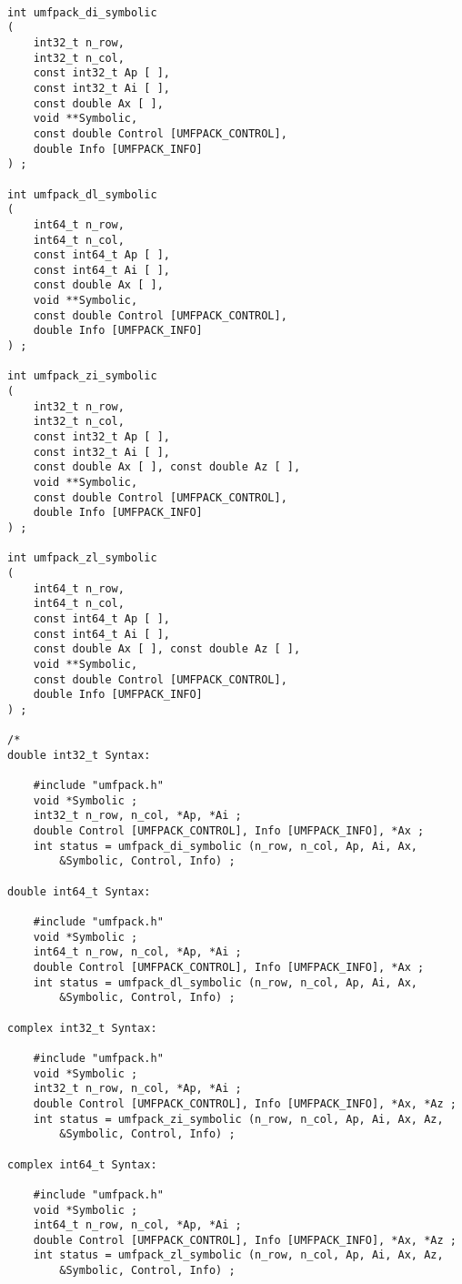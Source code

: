 \documentclass[11pt]{article}
\begin{document}
{\footnotesize
\begin{verbatim}

int umfpack_di_symbolic
(
    int32_t n_row,
    int32_t n_col,
    const int32_t Ap [ ],
    const int32_t Ai [ ],
    const double Ax [ ],
    void **Symbolic,
    const double Control [UMFPACK_CONTROL],
    double Info [UMFPACK_INFO]
) ;

int umfpack_dl_symbolic
(
    int64_t n_row,
    int64_t n_col,
    const int64_t Ap [ ],
    const int64_t Ai [ ],
    const double Ax [ ],
    void **Symbolic,
    const double Control [UMFPACK_CONTROL],
    double Info [UMFPACK_INFO]
) ;

int umfpack_zi_symbolic
(
    int32_t n_row,
    int32_t n_col,
    const int32_t Ap [ ],
    const int32_t Ai [ ],
    const double Ax [ ], const double Az [ ],
    void **Symbolic,
    const double Control [UMFPACK_CONTROL],
    double Info [UMFPACK_INFO]
) ;

int umfpack_zl_symbolic
(
    int64_t n_row,
    int64_t n_col,
    const int64_t Ap [ ],
    const int64_t Ai [ ],
    const double Ax [ ], const double Az [ ],
    void **Symbolic,
    const double Control [UMFPACK_CONTROL],
    double Info [UMFPACK_INFO]
) ;

/*
double int32_t Syntax:

    #include "umfpack.h"
    void *Symbolic ;
    int32_t n_row, n_col, *Ap, *Ai ;
    double Control [UMFPACK_CONTROL], Info [UMFPACK_INFO], *Ax ;
    int status = umfpack_di_symbolic (n_row, n_col, Ap, Ai, Ax,
        &Symbolic, Control, Info) ;

double int64_t Syntax:

    #include "umfpack.h"
    void *Symbolic ;
    int64_t n_row, n_col, *Ap, *Ai ;
    double Control [UMFPACK_CONTROL], Info [UMFPACK_INFO], *Ax ;
    int status = umfpack_dl_symbolic (n_row, n_col, Ap, Ai, Ax,
        &Symbolic, Control, Info) ;

complex int32_t Syntax:

    #include "umfpack.h"
    void *Symbolic ;
    int32_t n_row, n_col, *Ap, *Ai ;
    double Control [UMFPACK_CONTROL], Info [UMFPACK_INFO], *Ax, *Az ;
    int status = umfpack_zi_symbolic (n_row, n_col, Ap, Ai, Ax, Az,
        &Symbolic, Control, Info) ;

complex int64_t Syntax:

    #include "umfpack.h"
    void *Symbolic ;
    int64_t n_row, n_col, *Ap, *Ai ;
    double Control [UMFPACK_CONTROL], Info [UMFPACK_INFO], *Ax, *Az ;
    int status = umfpack_zl_symbolic (n_row, n_col, Ap, Ai, Ax, Az,
        &Symbolic, Control, Info) ;


\end{verbatim}}
\end{document}
